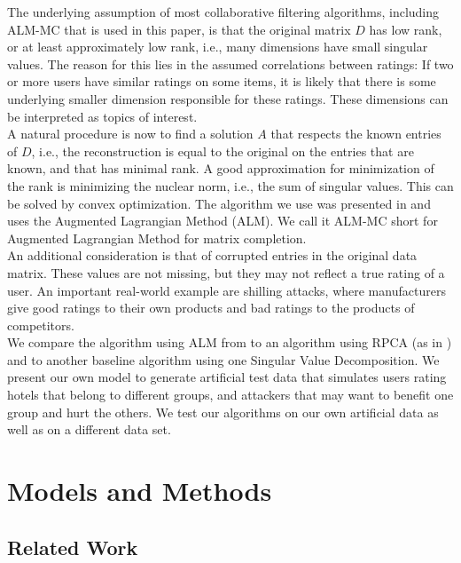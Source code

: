 \documentclass[10pt,conference,compsocconf]{IEEEtran}
\begin{document}
The underlying assumption of most collaborative filtering algorithms, including ALM-MC that is used in this paper,
is that the original matrix $D$ has low rank, or at least approximately low rank, i.e., many dimensions have small singular values. 
The reason for this lies in the assumed correlations between ratings:
If two or more users have similar ratings on some items, it is likely that there is some underlying smaller
dimension responsible for these ratings. These dimensions can be interpreted as topics of interest. \\

A natural procedure is now to find a solution $A$ that respects the known entries of $D$, i.e., the reconstruction is equal 
to the original on the entries that are known, and that has minimal rank. A good approximation for minimization
of the rank is minimizing the nuclear norm, i.e., the sum of singular values. This can be solved by convex optimization. 
The algorithm we use was presented in \cite{almpaper} and uses the Augmented Lagrangian Method (ALM). We call it ALM-MC short for Augmented Lagrangian Method for matrix completion. \\

An additional consideration is that of corrupted entries in the original data matrix. These values are not missing,
but they may not reflect a true rating of a user. An important real-world example are shilling attacks, where manufacturers
give good ratings to their own products and bad ratings to the products of competitors. \\

We compare the algorithm using ALM from \cite{almpaper} to an algorithm using RPCA (as in \cite{rpcapaper}) and to another baseline algorithm using one Singular Value Decomposition. We present our own model to generate artificial test data that simulates users rating hotels that belong to different groups, and attackers that may want to benefit one group and hurt the others. We test our algorithms on our own artificial data as well as on a different data set.

\section{Models and Methods}

\subsection{Related Work}
\end{document}
